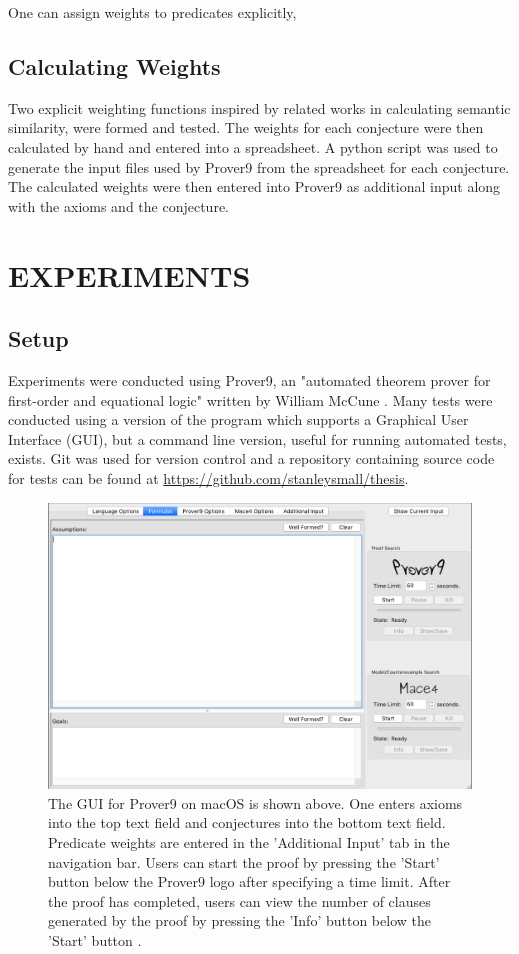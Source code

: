 \documentclass{article}
\begin{document}
One can assign weights to predicates explicitly, 

\subsection{Calculating Weights}
Two explicit weighting functions inspired by related works in calculating semantic similarity, were formed and tested. The weights for each conjecture were then calculated by hand and entered into a spreadsheet. A python script was used to generate the input files used by Prover9 from the spreadsheet for each conjecture. The calculated weights were then entered into Prover9 as additional input along with the axioms and the conjecture. 

\newpage
\vspace*{.05in}
\section{\MakeUppercase{Experiments}}

\subsection{{Setup}}

Experiments were conducted using Prover9, an "automated theorem prover for first-order and equational logic" written by William McCune \cite{mccune2005prover9}. Many tests were conducted using a version of the program which supports a Graphical User Interface (GUI), but a command line version, useful for running automated tests, exists. 
Git was used for version control and a repository containing source code for tests can be found at \url{https://github.com/stanleysmall/thesis}.
\begin{figure}[h]
\centering
\includegraphics[width=6in]{prover9}
\caption{The GUI for Prover9 on macOS is shown above. One enters axioms into the top text field and conjectures into the bottom text field. Predicate weights are entered in the 'Additional Input' tab in the navigation bar. Users can start the proof by pressing the 'Start' button below the Prover9 logo after specifying a time limit. After the proof has completed, users can view the number of clauses generated by the proof by pressing the 'Info' button below the 'Start' button \cite{mccune2005prover9}.}
\label{fig:prover9}
\end{figure}
\end{document}
